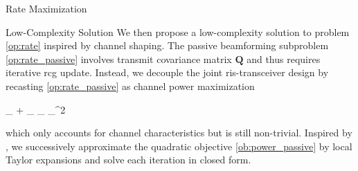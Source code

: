 \documentclass[journal]{IEEEtran}
\begin{document}
\begin{section}{Rate Maximization}
	\begin{subsection}{Low-Complexity Solution}
		We then propose a low-complexity solution to problem \eqref{op:rate} inspired by channel shaping.
		The passive beamforming subproblem \eqref{op:rate_passive} involves transmit covariance matrix $\mathbf{Q}$ and thus requires iterative \gls{rcg} update.
		Instead, we decouple the joint \gls{ris}-transceiver design by recasting \eqref{op:rate_passive} as channel power maximization
		\begin{maxi!}
			{\scriptstyle{\mathbf{\Theta}}}{\lVert {}_ + _ \mathbf{\Theta} _ \rVert _^2}{\label{op:power_passive}}{\label{ob:power_passive}}
		\end{maxi!}
		which only accounts for channel characteristics but is still non-trivial.
		Inspired by \cite{Nie2017}, we successively approximate the quadratic objective \eqref{ob:power_passive} by local Taylor expansions and solve each iteration in closed form.


\end{subsection}
\end{section}
\end{document}
